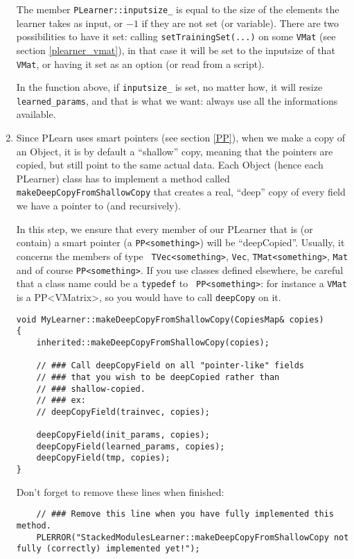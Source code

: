 \documentclass[11pt]{book}
\begin{document}
\begin{enumerate}
The member {\tt PLearner::inputsize\_} is equal to the size of the
elements the learner takes as input, or $-1$ if they are not
set (or variable). There are two possibilities to have it set:
calling {\tt setTrainingSet(...)} on some {\tt VMat} (see section
\ref{plearner_vmat}), in that case it will be set to the inputsize of
that {\tt VMat}, or having it set as an option (or read from a script).

In the function above, if {\tt inputsize\_} is set, no matter how, it
will resize {\tt learned\_params}, and that is what we want: always use
all the informations available.

\item Since PLearn uses smart pointers (see section \ref{PP}), when
we make a copy of an Object, it is by default a “shallow” copy,
meaning that the pointers are copied, but still point to the same actual
data. Each Object (hence each PLearner) class has to implement a method
called {\tt makeDeepCopyFromShallowCopy} that creates a real, “deep”
copy of every field we have a pointer to (and recursively).

In this step, we ensure that every member of our PLearner that
is (or contain) a smart pointer (a {\tt PP<something>}) will be
“deepCopied”. Usually, it concerns the members of type {\tt
TVec<something>}, {\tt Vec}, {\tt TMat<something>}, {\tt Mat} and of
course {\tt PP<something>}. If you use classes defined elsewhere,
be careful that a class name could be a {\tt typedef} to {\tt
PP<something>}: for instance a {\tt VMat} is a {PP<VMatrix>}, so you
would have to call {\tt deepCopy} on it.

\begin{verbatim}
void MyLearner::makeDeepCopyFromShallowCopy(CopiesMap& copies)
{
    inherited::makeDeepCopyFromShallowCopy(copies);

    // ### Call deepCopyField on all "pointer-like" fields
    // ### that you wish to be deepCopied rather than
    // ### shallow-copied.
    // ### ex:
    // deepCopyField(trainvec, copies);

    deepCopyField(init_params, copies);
    deepCopyField(learned_params, copies);
    deepCopyField(tmp, copies);
}
\end{verbatim}
Don't forget to remove these lines when finished:
\begin{verbatim}
    // ### Remove this line when you have fully implemented this method.
    PLERROR("StackedModulesLearner::makeDeepCopyFromShallowCopy not fully (correctly) implemented yet!");
\end{verbatim}


\end{enumerate}
\end{document}
